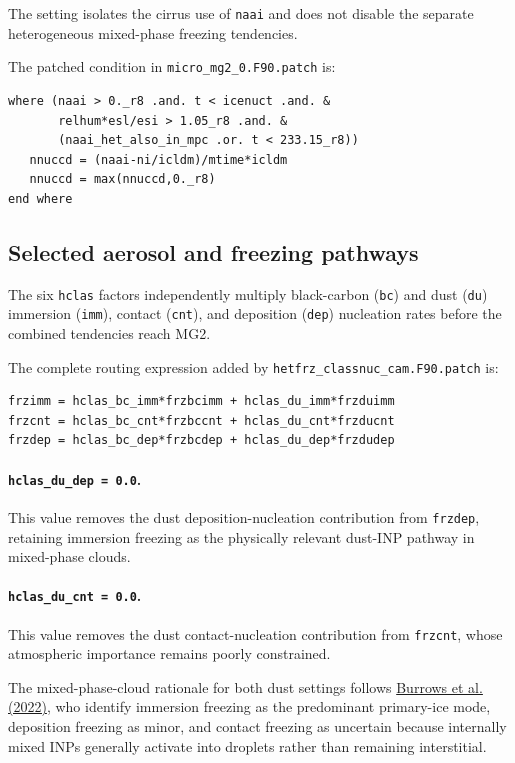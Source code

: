 The setting isolates the cirrus use of \texttt{naai} and does not disable the separate heterogeneous mixed-phase freezing tendencies.

The patched condition in \texttt{micro\_mg2\_0.F90.patch} is:

\begin{verbatim}
where (naai > 0._r8 .and. t < icenuct .and. &
       relhum*esl/esi > 1.05_r8 .and. &
       (naai_het_also_in_mpc .or. t < 233.15_r8))
   nnuccd = (naai-ni/icldm)/mtime*icldm
   nnuccd = max(nnuccd,0._r8)
end where
\end{verbatim}

\subsection*{Selected aerosol and freezing pathways}

The six \texttt{hclas} factors independently multiply black-carbon (\texttt{bc}) and dust (\texttt{du}) immersion (\texttt{imm}), contact (\texttt{cnt}), and deposition (\texttt{dep}) nucleation rates before the combined tendencies reach MG2.

The complete routing expression added by \texttt{hetfrz\_classnuc\_cam.F90.patch} is:

\begin{verbatim}
frzimm = hclas_bc_imm*frzbcimm + hclas_du_imm*frzduimm
frzcnt = hclas_bc_cnt*frzbccnt + hclas_du_cnt*frzducnt
frzdep = hclas_bc_dep*frzbcdep + hclas_du_dep*frzdudep
\end{verbatim}

\paragraph*{\texttt{hclas\_du\_dep = 0.0}.}
This value removes the dust deposition-nucleation contribution from \texttt{frzdep}, retaining immersion freezing as the physically relevant dust-INP pathway in mixed-phase clouds.

\paragraph*{\texttt{hclas\_du\_cnt = 0.0}.}
This value removes the dust contact-nucleation contribution from \texttt{frzcnt}, whose atmospheric importance remains poorly constrained.

The mixed-phase-cloud rationale for both dust settings follows \href{https://doi.org/10.1029/2021RG000745}{Burrows et al. (2022)}, who identify immersion freezing as the predominant primary-ice mode, deposition freezing as minor, and contact freezing as uncertain because internally mixed INPs generally activate into droplets rather than remaining interstitial.

